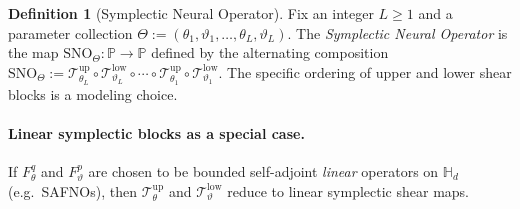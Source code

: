 \documentclass{article}
\theoremstyle{plain}
\theoremstyle{definition}
\newtheorem{definition}[theorem]{Definition}
\theoremstyle{remark}
\newcommand{\Hd}{\mathbb{H}_d}
\begin{document}
\begin{definition}[Symplectic Neural Operator]
\label{def:sympno}
Fix an integer $L\ge 1$ and a parameter collection
\(
\Theta := (\theta_1,\vartheta_1,\dots,\theta_L,\vartheta_L).
\)
The \emph{Symplectic Neural Operator} is the map $\mathrm{SNO}_\Theta:\mathbb{P}\to\mathbb{P}$
defined by the alternating composition
\(
\mathrm{SNO}_\Theta
:=
\mathcal{T}^{\mathrm{up}}_{\theta_L}\circ \mathcal{T}^{\mathrm{low}}_{\vartheta_L}
\circ \cdots \circ
\mathcal{T}^{\mathrm{up}}_{\theta_1}\circ \mathcal{T}^{\mathrm{low}}_{\vartheta_1}.
\)
The specific ordering of upper and lower shear blocks is a modeling choice.
\end{definition}
\paragraph{Linear symplectic blocks as a special case.}
If $F^{q}_{\theta}$ and $F^{p}_{\vartheta}$ are chosen to be bounded self-adjoint \emph{linear}
operators on $\Hd$ (e.g.\ SAFNOs), then $\mathcal{T}^{\mathrm{up}}_{\theta}$ and
$\mathcal{T}^{\mathrm{low}}_{\vartheta}$ reduce to linear symplectic shear maps.
\fi
\end{document}
